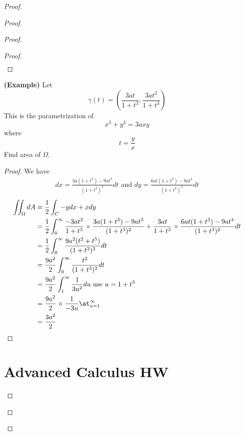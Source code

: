 \documentclass{report}
\begin{document}
\begin{proof}
\begin{proof}
\begin{proof}
\begin{proof}
\begin{align*}
\end{align*}
\end{proof}
\begin{theorem}
\label{7.3.15}
\textbf{(Example)} Let
\begin{equation*}
\gamma (t)=(\frac{3at}{1+t^3},\frac{3at^2}{1+t^3})
\end{equation*}
This is the parametrization of
\begin{equation*}
x^3+y^3=3axy
\end{equation*}
where 
\begin{equation*}
t=\frac{y}{x}
\end{equation*}
Find area of $\Omega$.
\end{theorem}
\begin{proof}
We have
\begin{align*}
dx=\frac{3a(1+t^3)-9at^3}{(1+t^3)^2}dt\text{ and }dy=\frac{6at(1+t^3)-9at^4}{(1+t^2)^2}dt
\end{align*}
\begin{align*}
\iint_{\Omega} dA&=\frac{1}{2}\int_C -ydx+xdy\\
&=\frac{1}{2}\int_0^\infty \frac{-3at^2}{1+t^3}\times \frac{3a(1+t^3)-9at^3}{(1+t^3)^2}+\frac{3at}{1+t^3}\times \frac{6at(1+t^3)-9at^4}{(1+t^3)^2}dt\\
&=\frac{1}{2}\int_0^\infty \frac{9a^2 (t^2+t^5)}{(1+t^3)^3}dt\\
&=\frac{9a^2}{2}\int_0^\infty \frac{t^2}{(1+t^3)^2}dt\\
&=\frac{9a^2}{2}\int_1^\infty \frac{1}{3u^2}du\text{ use $u=1+t^3$ }\\
&=\frac{9a^2}{2}\times \frac{1}{-3u}\at_{u=1}^\infty\\
&=\frac{3a^2}{2}
\end{align*}
\end{proof}


\chapter{Advanced Calculus HW}

\end{proof}
\end{proof}
\end{proof}
\end{document}
